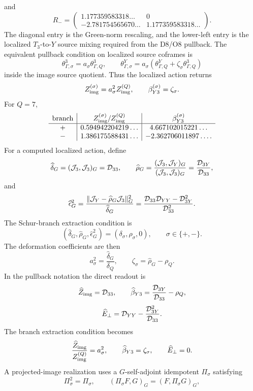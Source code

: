 \documentclass[11pt]{article}
\theoremstyle{definition}
\theoremstyle{remark}
\begin{document}
and
\[
R_-
=
\begin{pmatrix}
1.177359583318\ldots&0\\
-2.781754565670\ldots&1.177359583318\ldots
\end{pmatrix}.
\]
The diagonal entry is the Green-norm rescaling, and the lower-left entry is
the localized \(T_3\)-to-\(Y\) source mixing required from the D8/O8 pullback.
The equivalent pullback condition on localized source coframes is
\[
  \theta_{\Gamma,\sigma}^{3}
  =
  a_\sigma\theta_{\Gamma,Q}^{3},
  \qquad
  \theta_{\Gamma,\sigma}^{Y}
  =
  a_\sigma
  \left(
  \theta_{\Gamma,Q}^{Y}
  +\zeta_\sigma\theta_{\Gamma,Q}^{3}
  \right)
\]
inside the image source quotient.  Thus the localized action returns
\[
  Z_{\rm img}^{(\sigma)}=a_\sigma^2Z_{\rm img}^{(Q)},
  \qquad
  \beta_{Y3}^{(\sigma)}=\zeta_\sigma .
\]
For \(Q=7\),
\[
\begin{array}{c|c|c}
{\rm branch}&Z_{\rm img}^{(\sigma)}/Z_{\rm img}^{(Q)}
&\beta_{Y3}^{(\sigma)}\\ \hline
+&0.594942204219\ldots&4.667102015221\ldots\\
-&1.386175588431\ldots&-2.362706011897\ldots .
\end{array}
\]
For a computed localized action, define
\[
  \widehat\delta_G
  =
  ({\cal J}_3,{\cal J}_3)_G={\cal D}_{33},
  \qquad
  \widehat\rho_G
  =
  \frac{({\cal J}_3,{\cal J}_Y)_G}
       {({\cal J}_3,{\cal J}_3)_G}
  =
  \frac{{\cal D}_{3Y}}{{\cal D}_{33}},
\]
and
\[
  \widehat\epsilon_G^2
  =
  \frac{\|{\cal J}_Y-\widehat\rho_G{\cal J}_3\|_G^2}
       {\widehat\delta_G}
  =
  \frac{{\cal D}_{33}{\cal D}_{YY}-{\cal D}_{3Y}^2}
       {{\cal D}_{33}^2}.
\]
The Schur-branch extraction condition is
\[
  (\widehat\delta_G,\widehat\rho_G,\widehat\epsilon_G^2)
  =
  (\delta_\sigma,\rho_\sigma,0),
  \qquad \sigma\in\{+,-\}.
\]
The deformation coefficients are then
\[
  a_\sigma^2=\frac{\widehat\delta_G}{\delta_Q},
  \qquad
  \zeta_\sigma=\widehat\rho_G-\rho_Q .
\]
In the pullback notation the direct readout is
\[
  \widehat Z_{\rm img}= {\cal D}_{33},
  \qquad
  \widehat\beta_{Y3}=\frac{{\cal D}_{3Y}}{{\cal D}_{33}}-\rho_Q,
\]
\[
  \widehat E_\perp
  =
  {\cal D}_{YY}-\frac{{\cal D}_{3Y}^2}{{\cal D}_{33}} .
\]
The branch extraction condition becomes
\[
  \frac{\widehat Z_{\rm img}}{Z_{\rm img}^{(Q)}}=a_\sigma^2,
  \qquad
  \widehat\beta_{Y3}=\zeta_\sigma,
  \qquad
  \widehat E_\perp=0 .
\]
A projected-image realization uses a \(G\)-self-adjoint idempotent
\(\Pi_\sigma\) satisfying
\[
  \Pi_\sigma^2=\Pi_\sigma,
  \qquad
  (\Pi_\sigma F,G)_G=(F,\Pi_\sigma G)_G,
\]
\end{document}

